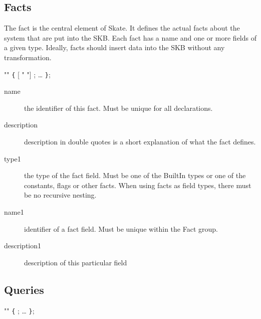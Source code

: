 \documentclass[a4paper,11pt,twoside]{report}
\begin{document}
{{\begin{description}
\end{description}

\subsection{Facts}
\label{sec:decl:facts}

The fact is the central element of Skate. It defines the actual facts about the
system that are put into the SKB. Each fact has a name and one or more fields
of a given type. Ideally, facts should insert data into the SKB without any 
transformation.

\begin{syntax}
   "" \verb+{+
      [ " "] ;
    \ldots
\verb+}+;
\end{syntax}

\begin{description}
    \item[name] the identifier of this fact. Must be unique for all 
                declarations.
    
    \item[description] description in double quotes is a short explanation of
                       what the fact defines.
    
    \item[type1] the type of the fact field. Must be one of the BuiltIn types
                 or one of the constants, flags or other facts. When using 
                 facts as field types, there must be no recursive nesting.

    \item [name1] identifier of a fact field. Must be unique within the 
                  Fact group.   
    
    \item [description1] description of this particular field
\end{description}

\subsection{Queries}


\begin{syntax}
  "" \verb+{+
    ;
    \ldots
\verb+}+;
\end{syntax}

}}
\end{document}
